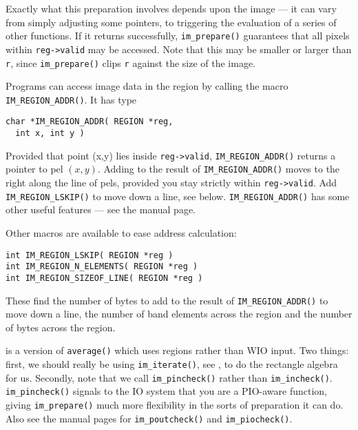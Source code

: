 Exactly what this preparation involves depends upon the image --- it can
vary from simply adjusting some pointers, to triggering the evaluation of a
series of other functions. If it returns successfully, \verb+im_prepare()+
guarantees that all pixels within \verb+reg->valid+ may be accessed. Note
that this may be smaller or larger than \verb+r+, since \verb+im_prepare()+
clips \verb+r+ against the size of the image.

Programs can access image data in the region by calling the macro
\verb+IM_REGION_ADDR()+. It has type

\begin{verbatim}
char *IM_REGION_ADDR( REGION *reg, 
  int x, int y ) 
\end{verbatim}

Provided that point (x,y) lies inside \verb+reg->valid+,
\verb+IM_REGION_ADDR()+ returns a pointer to pel $(x,y)$. Adding to the result
of \verb+IM_REGION_ADDR()+ moves to the right along the line of pels, provided
you stay strictly within \verb+reg->valid+. Add \verb+IM_REGION_LSKIP()+
to move down a line, see below. \verb+IM_REGION_ADDR()+ has some other
useful features --- see the manual page.

Other macros are available to ease address calculation:

\begin{verbatim}
int IM_REGION_LSKIP( REGION *reg )
int IM_REGION_N_ELEMENTS( REGION *reg )
int IM_REGION_SIZEOF_LINE( REGION *reg )
\end{verbatim}

\noindent
These find the number of bytes to add to the result of \verb+IM_REGION_ADDR()+
to move down a line, the number of band elements across the region and the
number of bytes across the region.

 is a version of \verb+average()+ which uses
regions rather than WIO input. Two things: first, we should really be
using \verb+im_iterate()+, see , to do the rectangle
algebra for us. Secondly, note that we call \verb+im_pincheck()+ rather
than \verb+im_incheck()+. \verb+im_pincheck()+ signals to the IO system
that you are a PIO-aware function, giving \verb+im_prepare()+ much more
flexibility in the sorts of preparation it can do. Also see the manual
pages for \verb+im_poutcheck()+ and \verb+im_piocheck()+.

